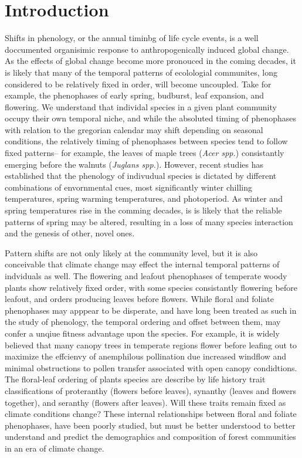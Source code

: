 \documentclass{article}
\begin{document}
\section*{Introduction}
Shifts in phenology, or the annual timinbg of life cycle events, is a well doccumented organisimic response to anthropogenically induced global change. As the effects of global change become more pronouced in the coming decades, it is likely that many of the temporal patterns of ecolologial communites, long considered to be relatively fixed in order, will become uncoupled. Take for example, the phenophases of early spring, budburst, leaf expansion, and flowering. We understand that individal species in a given plant community occupy their own temporal niche, and while the absoluted timing of phenophases with relation to the gregorian calendar may shift depending on seasonal conditions, the relatively timing of phenophases between species tend to follow fixed patterns-- for example, the leaves of maple trees (\textit{Acer spp.}) consistantly emerging before the walnuts (\textit{Juglans spp.}). However, recent studies has established that the phenology of indivudual species is dictated by different combinations of envornmental cues, most significantly winter chilling temperatures, spring warming temperatures, and photoperiod. As winter and spring temperatures rise in the comming decades, is is likely that the reliable patterns of spring may be altered, resulting in a loss of many species interaction and the genesis of other, novel ones.

Pattern shifts are not only likely at the community level, but it is also conceivable that climate change may effect the internal temporal patterns of indviduals as well.  The flowering and leafout phenophases of temperate woody plants show relatively fixed order, with some species consistantly flowering before leafout, and orders producing leaves before flowers. While floral and foliate phenophases may apppear to be disperate, and have long been treated as such in the study of phenology, the temporal ordering and offset between them, may confer a unqiue fitness advantage upon the species. For example, it is widely believed that many canopy trees in temperate regions flower before leafing out to maximize the effcienvy of anemphilous pollination due increased windflow and minimal obstructions to pollen transfer associated with open canopy condidtions. The floral-leaf ordering of plants species are describe by life history trait classifications of proteranthy (flowers before leaves), synanthy (leaves and flowers together), and seranthy (flowers after leaves). Will these traits remain fixed as climate conditions change? These internal relationships between floral and foliate phenophases, have been poorly studied, but must be better understood to better understand and predict the demographics and composition of forest communities in an era of climate change.
\end{document}
